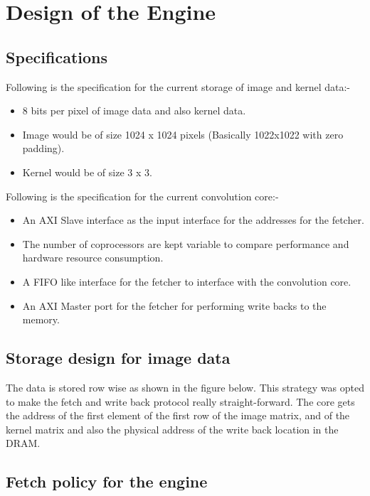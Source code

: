 \chapter{Design of the Engine}

\section*{Specifications}

Following is the specification for the current storage of image and kernel data:-

\begin{itemize}

\item 8 bits per pixel of image data and also kernel data.
\item Image would be of size 1024 x 1024 pixels (Basically 1022x1022 with zero padding).
\item Kernel would be of size 3 x 3.

\end{itemize}

Following is the specification for the current convolution core:- 

\begin{itemize}

\item An AXI Slave interface as the input interface for the addresses for the fetcher.
\item The number of coprocessors are kept variable to compare performance and hardware resource consumption.
\item A FIFO like interface for the fetcher to interface with the convolution core.
\item An AXI Master port for the fetcher for performing write backs to the memory.

\end{itemize}

\section{Storage design for image data}

The data is stored row wise as shown in the figure below. This strategy was opted to make the fetch and write back protocol really
straight-forward. The core gets the address of the first element of the first row of the image matrix, and of the kernel matrix and also the
physical address of the write back location in the DRAM.

\section{Fetch policy for the engine}

